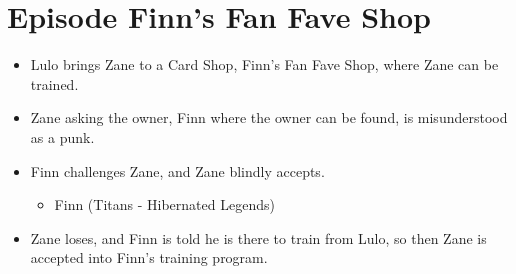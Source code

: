 \documentclass[12pt, letterpaper]{article}
\begin{document}
\section*{Episode Finn's Fan Fave Shop}
\begin{itemize}
    \item Lulo brings Zane to a Card Shop, Finn’s Fan Fave Shop, where Zane can be trained.
    \item Zane asking the owner, Finn where the owner can be found, is misunderstood as a punk.
    \item Finn challenges Zane, and Zane blindly accepts. 
    \begin{itemize}
        \item Finn (Titans - Hibernated Legends)    
    \end{itemize}
    \item Zane loses, and Finn is told he is there to train from Lulo, so then Zane is accepted into Finn’s training program.
\end{itemize}
\end{document}
